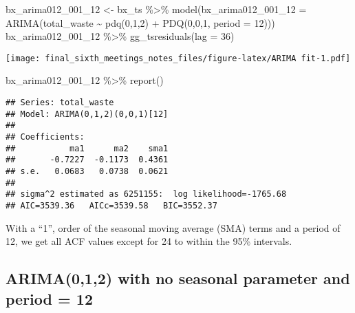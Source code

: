 \documentclass[
]{article}
\newenvironment{Shaded}{\begin{snugshade}}{\end{snugshade}}
\newcommand{\AttributeTok}[1]{\textcolor[rgb]{0.77,0.63,0.00}{#1}}
\newcommand{\DecValTok}[1]{\textcolor[rgb]{0.00,0.00,0.81}{#1}}
\newcommand{\FunctionTok}[1]{\textcolor[rgb]{0.00,0.00,0.00}{#1}}
\newcommand{\NormalTok}[1]{#1}
\newcommand{\OtherTok}[1]{\textcolor[rgb]{0.56,0.35,0.01}{#1}}
\newcommand{\SpecialCharTok}[1]{\textcolor[rgb]{0.00,0.00,0.00}{#1}}
\begin{document}
\begin{Shaded}
\begin{Highlighting}[]
\NormalTok{bx\_arima012\_001\_12 }\OtherTok{\textless{}{-}}\NormalTok{ bx\_ts }\SpecialCharTok{\%\textgreater{}\%} \FunctionTok{model}\NormalTok{(}\AttributeTok{bx\_arima012\_001\_12 =} \FunctionTok{ARIMA}\NormalTok{(total\_waste }\SpecialCharTok{\textasciitilde{}} \FunctionTok{pdq}\NormalTok{(}\DecValTok{0}\NormalTok{,}\DecValTok{1}\NormalTok{,}\DecValTok{2}\NormalTok{) }\SpecialCharTok{+} \FunctionTok{PDQ}\NormalTok{(}\DecValTok{0}\NormalTok{,}\DecValTok{0}\NormalTok{,}\DecValTok{1}\NormalTok{, }\AttributeTok{period =} \DecValTok{12}\NormalTok{)))}
\NormalTok{bx\_arima012\_001\_12 }\SpecialCharTok{\%\textgreater{}\%} \FunctionTok{gg\_tsresiduals}\NormalTok{(}\AttributeTok{lag =} \DecValTok{36}\NormalTok{)}
\end{Highlighting}
\end{Shaded}

\texttt{[image: final\_sixth\_meetings\_notes\_files/figure-latex/ARIMA fit-1.pdf]}

\begin{Shaded}
\begin{Highlighting}[]
\NormalTok{bx\_arima012\_001\_12 }\SpecialCharTok{\%\textgreater{}\%} \FunctionTok{report}\NormalTok{()}
\end{Highlighting}
\end{Shaded}

\begin{verbatim}
## Series: total_waste 
## Model: ARIMA(0,1,2)(0,0,1)[12] 
## 
## Coefficients:
##           ma1      ma2    sma1
##       -0.7227  -0.1173  0.4361
## s.e.   0.0683   0.0738  0.0621
## 
## sigma^2 estimated as 6251155:  log likelihood=-1765.68
## AIC=3539.36   AICc=3539.58   BIC=3552.37
\end{verbatim}

With a ``1'', order of the seasonal moving average (SMA) terms and a
period of 12, we get all ACF values except for 24 to within the 95\%
intervals.

\hypertarget{arima012-with-no-seasonal-parameter-and-period-12}{%
\subsection{ARIMA(0,1,2) with no seasonal parameter and period =
12}\label{arima012-with-no-seasonal-parameter-and-period-12}}
\end{document}
